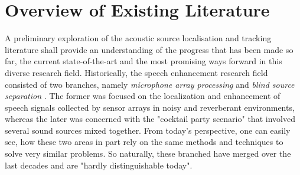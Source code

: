 \section{Overview of Existing Literature}
\label{chap:1literature_review}

A preliminary exploration of the acoustic source localisation and tracking literature shall provide an understanding of the progress that has been made so far, the current state-of-the-art and the most promising ways forward in this diverse research field.  
Historically, the speech enhancement research field consisted of two branches, namely \textit{microphone array processing} and \textit{blind source separation} \cite[p. 693]{Gannot2017}. The former was focused on the localization and enhancement of speech signals collected by sensor arrays in noisy and reverberant environments, whereas the later was concerned with the "cocktail party scenario" that involved several sound sources mixed together. From today's perspective, one can easily see, how these two areas in part rely on the same methods and techniques to solve very similar problems. So naturally, these branched have merged over the last decades and are "hardly distinguishable today". 




